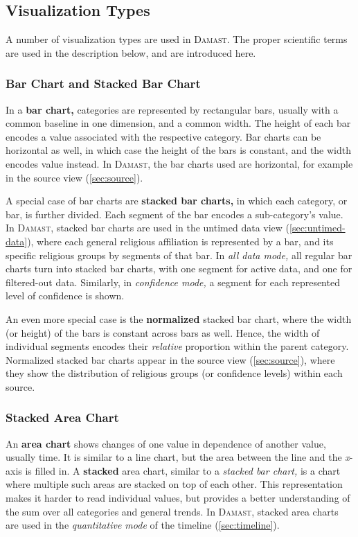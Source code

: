 \subsection{Visualization Types}

A number of visualization types are used in \textsc{Damast}.
The proper scientific terms are used in the description below, and are introduced here.

\subsubsection{Bar Chart and Stacked Bar Chart}

In a \textbf{bar chart,} categories are represented by rectangular bars, usually with a common baseline in one dimension, and a common width.
The height of each bar encodes a value associated with the respective category.
Bar charts can be horizontal as well, in which case the height of the bars is constant, and the width encodes value instead.
In \textsc{Damast}, the bar charts used are horizontal, for example in the source view (\cref{sec:source}).

A special case of bar charts are \textbf{stacked bar charts,} in which each category, or bar, is further divided.
Each segment of the bar encodes a sub-category's value.
In \textsc{Damast}, stacked bar charts are used in the untimed data view (\cref{sec:untimed-data}), where each general religious affiliation is represented by a bar, and its specific religious groups by segments of that bar.
In \emph{all data mode,} all regular bar charts turn into stacked bar charts, with one segment for active data, and one for filtered-out data.
Similarly, in \emph{confidence mode,} a segment for each represented level of confidence is shown.

An even more special case is the \textbf{normalized} stacked bar chart, where the width (or height) of the bars is constant across bars as well.
Hence, the width of individual segments encodes their \emph{relative} proportion within the parent category.
Normalized stacked bar charts appear in the source view (\cref{sec:source}), where they show the distribution of religious groups (or confidence levels) within each source.

\subsubsection{Stacked Area Chart}

An \textbf{area chart} shows changes of one value in dependence of another value, usually time.
It is similar to a line chart, but the area between the line and the \emph{x}-axis is filled in.
A \textbf{stacked} area chart, similar to a \emph{stacked bar chart,} is a chart where multiple such areas are stacked on top of each other.
This representation makes it harder to read individual values, but provides a better understanding of the sum over all categories and general trends.
In \textsc{Damast}, stacked area charts are used in the \emph{quantitative mode} of the timeline (\cref{sec:timeline}).

